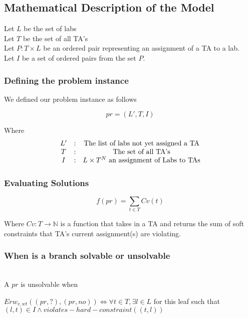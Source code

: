 \documentclass{article}
\begin{document}
\subsection{Mathematical Description of the Model}

Let $L$ be the set of labs\\

Let $T$ be the set of all TA's\\

Let $P: T \times L$ be an ordered pair representing an assignment of a
TA to a lab.\\

Let $I$ be a set of ordered pairs from the set $P$.

\subsubsection{Defining the problem instance}

We defined our problem instance as follows

\[
pr = (L', T, I)
\]

Where \\

\[
\begin{array}{c c c}
  L' & : & \text{The list of labs not yet assigned a TA}\\
  T & : & \text{The set of all TA's}\\
  I & : & \text{$L \times  T^N$ an assignment of Labs to TAs}
\end{array}
\]

\subsubsection{Evaluating Solutions}

\[
f(pr) = \sum_{t \in T} Cv(t)
\]

Where $Cv: T \rightarrow \mathbb{N}$ is a function that takes in a TA
and returns the sum of soft constraints that TA's current
assignment(s) are violating. 

\subsubsection{When is a branch solvable or unsolvable}\\

A $pr$ is unsolvable when

\begin{center}
  $Erw_{v,wt}((pr, ?),(pr, no)) \iff \forall t \in T , \exists
  l \in L$ for this leaf such that $(l, t) \in I \land violates-hard-constraint((t,l))$
\end{center}
\end{document}
